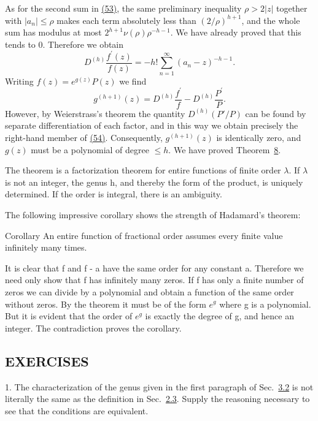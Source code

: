 As for the second sum in \hyperref[eq:5.53]{(53)}, the same preliminary inequality $\rho > 2|z|$ together with $|a_n| \leq \rho$ makes each term absolutely less than $(2 / \rho)^{h + 1}$, and the whole sum has modulus at most $2^{h + 1} \nu(\rho) \rho^{-h - 1}$. We have already proved that this tends to 0. Therefore we obtain
\begin{equation*}
D ^ {(h)} \frac {f ^ {\prime} (z)}{f (z)} = - h! \sum_ {n = 1} ^ {\infty} (a _ {n} - z) ^ {- h - 1}.\tag{54}\label{eq:5.54}
\end{equation*}
Writing $f(z) = e^{g(z)}P(z)$ we find
\begin{equation*}
g ^ {(h + 1)} (z) = D ^ {(h)} \frac {f ^ {\prime}}{f} - D ^ {(h)} \frac {P ^ {\prime}}{P}.
\end{equation*}
However, by Weierstrass's theorem the quantity $D^{(h)}(P'/P)$ can be found by separate differentiation of each factor, and in this way we obtain precisely the right-hand member of \hyperref[eq:5.54]{(54)}. Consequently, $g^{(h+1)}(z)$ is identically zero, and $g(z)$ must be a polynomial of degree $\leq h$. We have proved Theorem~\hyperref[thm:5.8]{8}.

The theorem is a factorization theorem for entire functions of finite order $\lambda$. If $\lambda$ is not an integer, the genus h, and thereby the form of the product, is uniquely determined. If the order is integral, there is an ambiguity.

The following impressive corollary shows the strength of Hadamard's theorem:

\begin{originalstatement}{Corollary}{}\label{cor:5.unnumbered-p227-b15}
An entire function of fractional order assumes every finite value infinitely many times.
\end{originalstatement}

It is clear that f and f - a have the same order for any constant a. Therefore we need only show that f has infinitely many zeros. If f has only a finite number of zeros we can divide by a polynomial and obtain a function of the same order without zeros. By the theorem it must be of the form $e^{g}$ where g is a polynomial. But it is evident that the order of $e^{g}$ is exactly the degree of g, and hence an integer. The contradiction proves the corollary.

\subsection*{EXERCISES}
1. The characterization of the genus given in the first paragraph of Sec.~\hyperref[sec:5.3.2]{3.2} is not literally the same as the definition in Sec.~\hyperref[sec:5.2.3]{2.3}. Supply the reasoning necessary to see that the conditions are equivalent.

